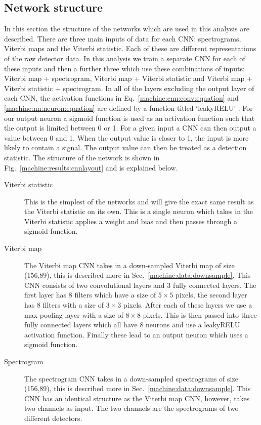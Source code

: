 \subsection{\label{machine:cw:structure}Network structure}

In this section the structure of the networks which are used in this analysis
are described. There are three main inputs of data for each \gls{CNN}: spectrograms, Viterbi maps and the Viterbi statistic. Each of these are different representations of the raw detector data. In this analysis we train a separate \gls{CNN} for each of
these inputs and then a further three which use these combinations of inputs:
Viterbi map + spectrogram, Viterbi map + Viterbi statistic and Viterbi map +
Viterbi statistic + spectrogram. In all of the layers excluding the output layer of each \gls{CNN}, the activation functions in Eq.~\ref{machine:cnn:conv:equation} and \ref{machine:nn:neuron:equation} are defined by a function titled `leakyRELU' \cite{maas2013RectifierNonlinearities}. 
For our output neuron a sigmoid function is
used as an activation function such that the output is limited between 0 or 1.
For a given input a \gls{CNN} can then output a value between 0 and 1. When the output value is closer to 1, the input is more likely to contain a signal. 
The output value can then be treated as a detection statistic. 
The structure of the network is shown in Fig.~\ref{machine:results:cnnlayout} and is explained below. 

\begin{description}
	\item [Viterbi statistic] This is the simplest of the networks and will
	give the exact same result as the Viterbi statistic on its own. This is a
	single neuron which takes in the Viterbi statistic applies a weight and bias
	and then passes through a sigmoid function.
	
	\item [Viterbi map] The Viterbi map \gls{CNN} takes in a down-sampled Viterbi map of size (156,89), this is described more in Sec.~\ref{machine:data:downsample}.
	This \gls{CNN} consists of two convolutional layers and 3 fully connected layers. The first layer has
	8 filters which have a size of $5\times5$ pixels, the second layer has 8
	filters with a size of $3\times3$ pixels. After each of these layers we use a
	max-pooling layer with a size of $8\times8$ pixels. This is then passed into three
	fully connected layers which all have 8 neurons and use a leakyRELU activation
	function. Finally these lead to an output neuron which uses a sigmoid
	function.
	
	\item [Spectrogram] The spectrogram \gls{CNN} takes in a down-sampled spectrograms of size (156,89), this is described more in Sec.~\ref{machine:data:downsample}.
	This \gls{CNN} has an identical structure as the Viterbi map \gls{CNN}, however, takes two channels as input. The two channels are the spectrograms of two different detectors.
	
\end{description}

